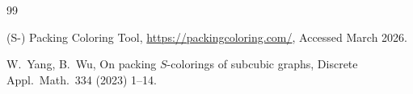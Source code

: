 \documentclass[12pt]{article}
\begin{document}
\begin{thebibliography}{99}

(S-) Packing Coloring Tool,
\url{https://packingcoloring.com/},
Accessed March 2026.

W.~Yang, B.~Wu, 
On packing $S$-colorings of subcubic graphs,
Discrete Appl.\ Math.\ 334 (2023) 1--14.



\end{thebibliography}
\end{document}
